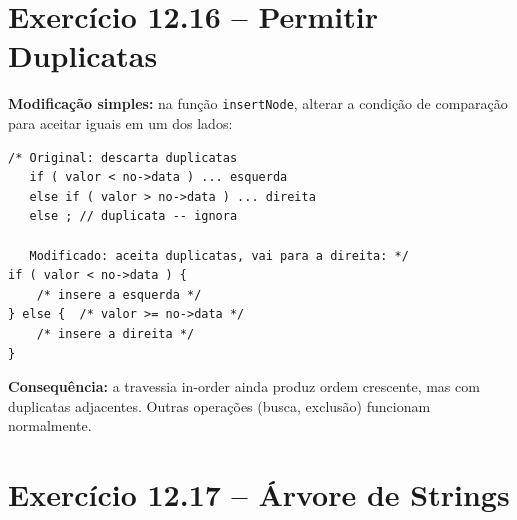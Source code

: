 \documentclass[12pt,a4paper]{article}
\begin{document}
\section{Exercício 12.16 -- Permitir Duplicatas}

\begin{respostabox}
\textbf{Modificação simples:} na função \texttt{insertNode}, alterar a condição
de comparação para aceitar iguais em um dos lados:

\begin{lstlisting}
/* Original: descarta duplicatas
   if ( valor < no->data ) ... esquerda
   else if ( valor > no->data ) ... direita
   else ; // duplicata -- ignora

   Modificado: aceita duplicatas, vai para a direita: */
if ( valor < no->data ) {
    /* insere a esquerda */
} else {  /* valor >= no->data */
    /* insere a direita */
}
\end{lstlisting}

\textbf{Consequência:} a travessia in-order ainda produz ordem crescente, mas com
duplicatas adjacentes. Outras operações (busca, exclusão) funcionam normalmente.
\end{respostabox}

\newpage

\section{Exercício 12.17 -- Árvore de Strings}
\end{document}

